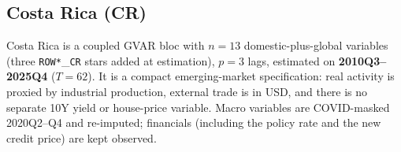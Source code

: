 \subsection{Costa Rica (CR)}\label{sec:data:CR}
Costa Rica is a coupled GVAR bloc with $n=13$ domestic-plus-global
variables (three \texttt{ROW*}\_\texttt{CR} stars added at estimation),
$p=3$ lags, estimated on \textbf{2010Q3--2025Q4} ($T=62$).  It is a
compact emerging-market specification: real activity is proxied by
industrial production, external trade is in USD, and there is no separate
10Y yield or house-price variable.  Macro variables are COVID-masked
2020Q2--Q4 and re-imputed; financials (including the policy rate and the
new credit price) are kept observed.

